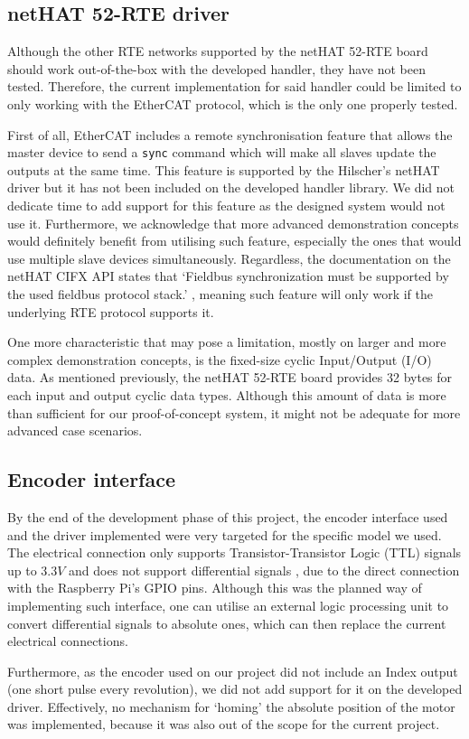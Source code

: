 \subsection{netHAT 52-RTE driver}
Although the other RTE networks supported by the netHAT 52-RTE board should work out-of-the-box with the developed handler, they have not been tested.
Therefore, the current implementation for said handler could be limited to only working with the EtherCAT protocol, which is the only one properly tested.

First of all, EtherCAT includes a remote synchronisation feature that allows the master device to send a \verb|sync| command which will make all slaves update the outputs at the same time.
This feature is supported by the Hilscher's netHAT driver but it has not been included on the developed handler library.
We did not dedicate time to add support for this feature as the designed system would not use it.
Furthermore, we acknowledge that more advanced demonstration concepts would definitely benefit from utilising such feature, especially the ones that would use multiple slave devices simultaneously.
Regardless, the documentation on the netHAT CIFX API states that `Fieldbus synchronization must be supported by the used fieldbus protocol stack.' \cite{nethat:cifx_api_docs}, meaning such feature will only work if the underlying RTE protocol supports it.

One more characteristic that may pose a limitation, mostly on larger and more complex demonstration concepts, is the fixed-size cyclic Input/Output (I/O) data.
As mentioned previously, the netHAT 52-RTE board provides 32 bytes for each input and output cyclic data types.
Although this amount of data is more than sufficient for our proof-of-concept system, it might not be adequate for more advanced case scenarios.

\subsection{Encoder interface}
By the end of the development phase of this project, the encoder interface used and the driver implemented were very targeted for the specific model we used.
The electrical connection only supports Transistor-Transistor Logic (TTL) signals up to $3.3V$ and does not support differential signals \cite{technology:diff-signals}, due to the direct connection with the Raspberry Pi's GPIO pins.
Although this was the planned way of implementing such interface, one can utilise an external logic processing unit to convert differential signals to absolute ones, which can then replace the current electrical connections.

Furthermore, as the encoder used on our project did not include an Index output (one short pulse every revolution), we did not add support for it on the developed driver.
Effectively, no mechanism for `homing' the absolute position of the motor was implemented, because it was also out of the scope for the current project.


